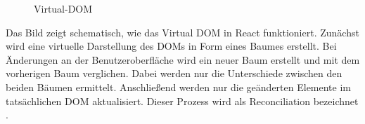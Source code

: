 \begin{figure}[htbp]
	\centering
	\caption{Virtual-DOM}
\end{figure}
\newpage
Das Bild zeigt schematisch, wie das Virtual DOM in React funktioniert. Zunächst wird eine virtuelle Darstellung des DOMs in Form eines Baumes erstellt. Bei Änderungen an der Benutzeroberfläche wird ein neuer Baum erstellt und mit dem vorherigen Baum verglichen. Dabei werden nur die Unterschiede zwischen den beiden Bäumen ermittelt. Anschließend werden nur die geänderten Elemente im tatsächlichen DOM aktualisiert. Dieser Prozess wird als Reconciliation bezeichnet \cite{ReactVirtualDOM}.

